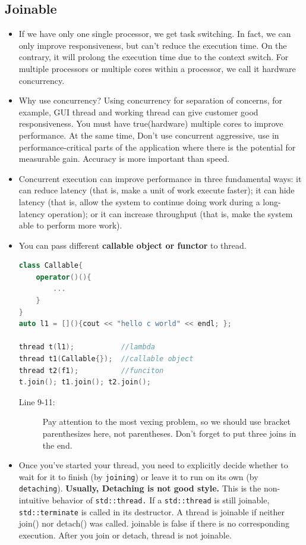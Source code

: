 \documentclass[a4paper,11pt,twoside]{book}
\begin{document}
\subsection{Joinable}
\begin{itemize}
	\item If we have only one single processor, we get task switching. In fact, we can only improve responsiveness, but can't reduce the execution time. On the contrary, it will prolong the execution time due to the context switch. For multiple processors or multiple cores within a processor, we call it hardware concurrency. 

	\item Why use concurrency?  Using concurrency for separation of concerns, for example, GUI thread and working thread can give customer good responsiveness. You must have true(hardware) multiple cores to improve performance.  At the same time, Don't use concurrent aggressive, use in performance-critical parts of the application where there is the potential for measurable gain. Accuracy is more important than speed. 

	\item Concurrent execution can improve performance in three fundamental ways: it can reduce latency (that is, make a unit of work execute faster); it can hide latency (that is, allow the system to continue doing work during a long-latency operation); or it can increase throughput (that is, make the system able to perform more work). 

	\item You can pass different \textbf{callable object or functor} to thread. 
\begin{lstlisting}[frame=single, language=c++]
class Callable{
	operator()(){
		...
	}
}
auto l1 = [](){cout << "hello c world" << endl; };

thread t(l1);           //lambda
thread t1(Callable{});  //callable object
thread t2(f1);          //funciton
t.join(); t1.join(); t2.join();
\end{lstlisting}

\begin{description}
	\item[Line 9-11:] Pay attention to the most vexing problem, so we should use bracket parenthesizes here, not parentheses. Don't forget to put three joins in the end.
\end{description}

	\item Once you've started your thread, you need to explicitly decide whether to wait for it to finish (by \texttt{joining}) or leave it to run on its own (by \texttt{detaching}). \textbf{Usually, Detaching is not good style.} This is the non-intuitive behavior of \texttt{std::thread.} If a \texttt{std::thread} is still joinable, \texttt{std::terminate} is called in its destructor. A thread is joinable if neither join() nor detach() was called. joinable is false if there is no corresponding execution. After you join or detach, thread is not joinable.


\end{itemize}
\end{document}
